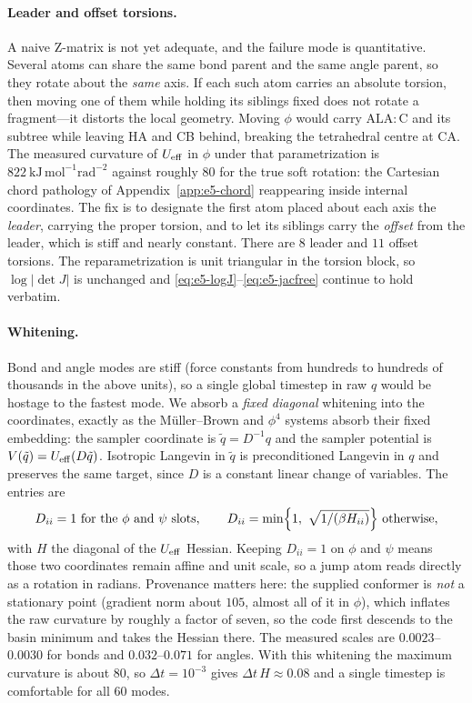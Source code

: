 \documentclass[11pt]{article}
\begin{document}
\paragraph{Leader and offset torsions.}
A naive Z-matrix is not yet adequate, and the failure mode is quantitative.
Several atoms can share the same bond parent and the same angle parent, so they
rotate about the \emph{same} axis.  If each such atom carries an absolute
torsion, then moving one of them while holding its siblings fixed does not
rotate a fragment---it distorts the local geometry.  Moving $\phi$ would carry
$\mathrm{ALA\!:\!C}$ and its subtree while leaving HA and CB behind, breaking
the tetrahedral centre at CA.  The measured curvature of $U_{\rm eff}$ in
$\phi$ under that parametrization is $822\ \mathrm{kJ\,mol^{-1}rad^{-2}}$
against roughly $80$ for the true soft rotation: the Cartesian chord pathology
of Appendix~\ref{app:e5-chord} reappearing inside internal coordinates.  The
fix is to designate the first atom placed about each axis the \emph{leader},
carrying the proper torsion, and to let its siblings carry the \emph{offset}
from the leader, which is stiff and nearly constant.  There are $8$ leader and
$11$ offset torsions.  The reparametrization is unit triangular in the torsion
block, so $\log|\det J|$ is unchanged and \eqref{eq:e5-logJ}--\eqref{eq:e5-jacfree}
continue to hold verbatim.

\paragraph{Whitening.}
Bond and angle modes are stiff (force constants from hundreds to hundreds of
thousands in the above units), so a single global timestep in raw $q$ would be
hostage to the fastest mode.  We absorb a \emph{fixed diagonal} whitening into
the coordinates, exactly as the M\"uller--Brown and $\phi^4$ systems absorb
their fixed embedding: the sampler coordinate is $\tilde q=D^{-1}q$ and the
sampler potential is $V(\tilde q)=U_{\rm eff}(D\tilde q)$.  Isotropic Langevin
in $\tilde q$ is preconditioned Langevin in $q$ and preserves the same target,
since $D$ is a constant linear change of variables.  The entries are
\begin{equation}
 D_{ii}=1\ \text{for the $\phi$ and $\psi$ slots},\qquad
 D_{ii}=\min\Bigl\{1,\ \sqrt{1/(\beta H_{ii})}\Bigr\}\ \text{otherwise},
\end{equation}
with $H$ the diagonal of the $U_{\rm eff}$ Hessian.  Keeping $D_{ii}=1$ on
$\phi$ and $\psi$ means those two coordinates remain affine and unit scale, so
a jump atom reads directly as a rotation in radians.  Provenance matters here:
the supplied conformer is \emph{not} a stationary point (gradient norm about
$105$, almost all of it in $\phi$), which inflates the raw curvature by roughly
a factor of seven, so the code first descends to the basin minimum and takes
the Hessian there.  The measured scales are $0.0023$--$0.0030$ for bonds and
$0.032$--$0.071$ for angles.  With this whitening the maximum curvature is
about $80$, so $\Delta t=10^{-3}$ gives $\Delta t\,H\approx0.08$ and a single
timestep is comfortable for all $60$ modes.
\end{document}
